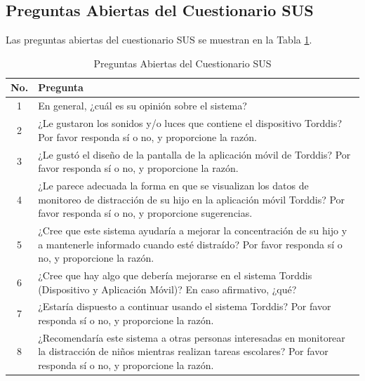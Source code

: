 \documentclass[a4paper,fleqn]{cas-sc}
\begin{document}
	\subsection[\appendixname~\thesection]{Preguntas Abiertas del Cuestionario SUS}
	\label{Appendix:OpenQuestions}
	Las preguntas abiertas del cuestionario SUS se muestran en la Tabla \ref{tab:OpenQuestion}.
	\begin{table}[bt!]
		\centering
		\caption{Preguntas Abiertas del Cuestionario SUS \label{tab:OpenQuestion}}
		\begin{tabularx}{\textwidth}{c X }
			\toprule
			\textbf{No.} & \textbf{Pregunta} \\
			\midrule
			1 & En general, ¿cuál es su opinión sobre el sistema? \\
			2 & ¿Le gustaron los sonidos y/o luces que contiene el dispositivo Torddis? Por favor responda sí o no, y proporcione la razón. \\
			3 & ¿Le gustó el diseño de la pantalla de la aplicación móvil de Torddis? Por favor responda sí o no, y proporcione la razón. \\
			4 & ¿Le parece adecuada la forma en que se visualizan los datos de monitoreo de distracción de su hijo en la aplicación móvil Torddis? Por favor responda sí o no, y proporcione sugerencias. \\
			5 & ¿Cree que este sistema ayudaría a mejorar la concentración de su hijo y a mantenerle informado cuando esté distraído? Por favor responda sí o no, y proporcione la razón. \\
			6 & ¿Cree que hay algo que debería mejorarse en el sistema Torddis (Dispositivo y Aplicación Móvil)? En caso afirmativo, ¿qué? \\
			7 & ¿Estaría dispuesto a continuar usando el sistema Torddis? Por favor responda sí o no, y proporcione la razón. \\
			8 & ¿Recomendaría este sistema a otras personas interesadas en monitorear la distracción de niños mientras realizan tareas escolares? Por favor responda sí o no, y proporcione la razón. \\ \bottomrule
		\end{tabularx}
	\end{table}
\end{document}
